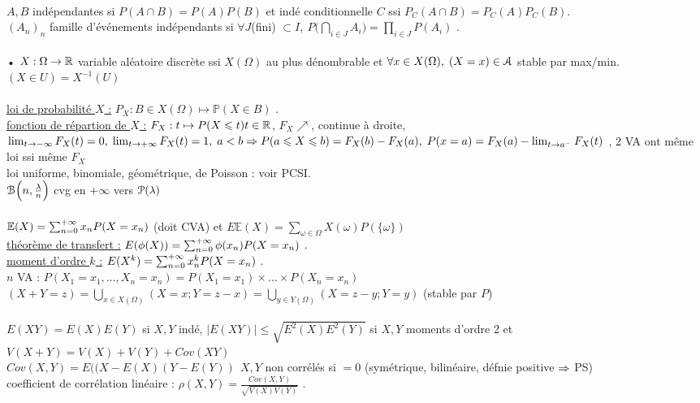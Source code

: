 \documentclass[12 pt]{exampleclass}
\begin{document}
\text{}\\
$A, B$ indépendantes si $P(A\cap B) = P(A)P(B)$ et indé conditionnelle $C$ ssi $P_C(A\cap B) = P_C(A)P_C(B)$.\\
$(A_n)_n$ famille d'événements indépendants si $\forall J$(fini) $\subset I, \ P\Big( \bigcap_{i\in J} A_i\Big) = \prod_{i\in J} P(A_i)$ .\\
\text{}\\
• $X: \Omega \to \mathbb{R}$ variable aléatoire discrète ssi $X(\Omega)$ au plus dénombrable et $\forall x\in X(\Omega), \; (X=x)\in \mathcal{A}$ stable par max/min. \qquad \qquad $(X\in U)=X^{-1}(U)$\\
\text{}\\
\underline{loi de probabilité $X$ :} $P_X : B\in X(\Omega) \mapsto \mathbb{P}(X\in B)$ .\\
\underline{fonction de répartion de $X$ :} $F_X : t\mapsto P(X\leqslant t) t\in\mathbb{R}$, $F_X \nearrow$, continue à droite, $\lim_{t\to-\infty} F_X(t) = 0, \; \lim_{t\to+\infty} F_X(t) =1, \; a<b \Rightarrow P(a\leqslant X\leqslant b) = F_X(b) - F_X(a), \; P(x=a) = F_X(a) - \lim_{t\to a^-}F_X(t)$ , 2 VA ont même loi ssi même $F_X$\\
loi uniforme, binomiale, géométrique, de Poisson : voir PCSI.\\
$\mathcal{B}\Big(n,\frac{\lambda}{n}\Big)$ cvg en $+\infty$ vers $\mathcal{P}(\lambda)$\\
\text{}\\
$\mathbb{E}(X) = \sum_{n=0}^{+\infty} x_n P(X=x_n)$ (doit CVA) et $E\mathbb{E}(X) = \sum_{\omega\in\Omega} X(\omega)P(\{\omega\})$\\
\underline{théorème de transfert :} $E(\phi(X)) = \sum_{n=0}^{+\infty} \phi(x_n) P(X=x_n)$ .\\
\underline{moment d'ordre $k$ :} $E(X^k) = \sum_{n=0}^{+\infty} x_n^k P(X=x_n)$ .\\
$n$ VA : $P(X_1 =x_1,\dots, X_n = x_n) = P(X_1 =x_1) \times \dots \times P(X_n = x_n)$\\
$(X+Y = z) = \bigcup_{x\in X(\Omega)} (X=x;Y=z-x) =  \bigcup_{y\in Y(\Omega)} (X=z-y;Y=y)$ \quad (stable par $P$)\\
\text{}\\
$E(XY) = E(X)E(Y)$ si $X,Y$ indé, $|E(XY)| \leqslant \sqrt{E^2(X)E^2(Y)}$ si $X,Y$ moments d'ordre 2 et $ V(X+Y) = V(X) + V(Y) + Cov(XY)$\\
$Cov(X,Y) = E((X-E(X)(Y-E(Y)) \ \ X,Y$ non corrélés si $=0$ (symétrique, bilinéaire, défnie positive $\Rightarrow$ PS)\\
coefficient de corrélation linéaire : $\rho(X,Y)  = \frac{Cov(X,Y)}{\sqrt{V(X)V(Y)}}$ .\\
\end{document}
